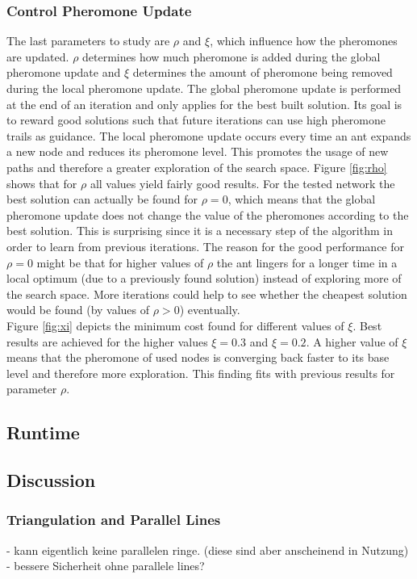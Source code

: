 \subsubsection{Control Pheromone Update}\label{pheromone_update}

The last parameters to study are $\rho$ and $\xi$, which influence how the pheromones are updated. $\rho$ determines how much pheromone is added during the global pheromone update and $\xi$ determines the amount of pheromone being removed during the local pheromone update. The global pheromone update is performed at the end of an iteration and only applies for the best built solution. Its goal is to reward good solutions such that future iterations can use high pheromone trails as guidance. The local pheromone update occurs every time an ant expands a new node and reduces its pheromone level. This promotes the usage of new paths and therefore a greater exploration of the search space. Figure \ref{fig:rho} shows that for $\rho$ all values yield fairly good results. For the tested network the best solution can actually be found for $\rho = 0$, which means that the global pheromone update does not change the value of the pheromones according to the best solution. This is surprising since it is a necessary step of the algorithm in order to learn from previous iterations. The reason for the good performance for $\rho = 0$ might be that for higher values of $\rho$ the ant lingers for a longer time in a local optimum (due to a previously found solution) instead of exploring more of the search space. More iterations could help to see whether the cheapest solution would be found (by values of $\rho > 0$) eventually. \\

Figure \ref{fig:xi} depicts the minimum cost found for different values of $\xi$. Best results are achieved for the higher values $\xi = 0.3$ and $\xi = 0.2$. A higher value of $\xi$ means that the pheromone of used nodes is converging back faster to its base level and therefore more exploration. This finding fits with previous results for parameter $\rho$.

\subsection{Runtime}
\subsection{Discussion}\label{sec:discussion}
\subsubsection{Triangulation and Parallel Lines}
	- kann eigentlich keine parallelen ringe. (diese sind aber anscheinend in Nutzung)
	- bessere Sicherheit ohne parallele lines?